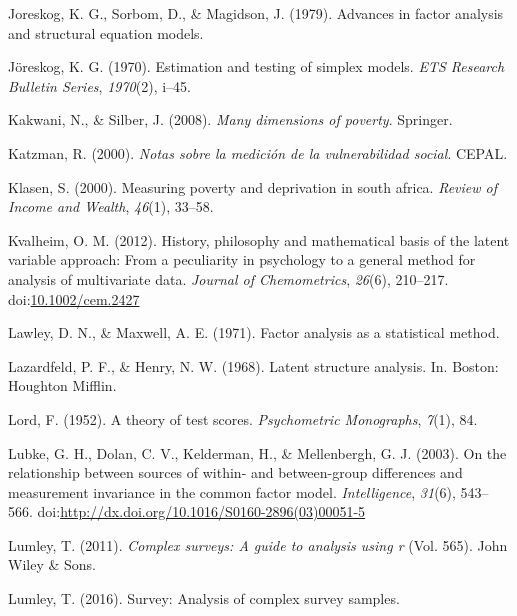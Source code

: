 \documentclass[]{book}
\begin{document}
\leavevmode\hypertarget{ref-Joreskog1979}{}%
Joreskog, K. G., Sorbom, D., \& Magidson, J. (1979). Advances in factor analysis and structural equation models.

\leavevmode\hypertarget{ref-Joereskog1970}{}%
Jöreskog, K. G. (1970). Estimation and testing of simplex models. \emph{ETS Research Bulletin Series}, \emph{1970}(2), i--45.

\leavevmode\hypertarget{ref-Kakwani2008a}{}%
Kakwani, N., \& Silber, J. (2008). \emph{Many dimensions of poverty}. Springer.

\leavevmode\hypertarget{ref-Katzman2000}{}%
Katzman, R. (2000). \emph{Notas sobre la medición de la vulnerabilidad social}. CEPAL.

\leavevmode\hypertarget{ref-Klasen2000}{}%
Klasen, S. (2000). Measuring poverty and deprivation in south africa. \emph{Review of Income and Wealth}, \emph{46}(1), 33--58.

\leavevmode\hypertarget{ref-Kvalheim2012}{}%
Kvalheim, O. M. (2012). History, philosophy and mathematical basis of the latent variable approach: From a peculiarity in psychology to a general method for analysis of multivariate data. \emph{Journal of Chemometrics}, \emph{26}(6), 210--217. doi:\href{https://doi.org/10.1002/cem.2427}{10.1002/cem.2427}

\leavevmode\hypertarget{ref-Lawley1971}{}%
Lawley, D. N., \& Maxwell, A. E. (1971). Factor analysis as a statistical method.

\leavevmode\hypertarget{ref-Lazardfeld1968}{}%
Lazardfeld, P. F., \& Henry, N. W. (1968). Latent structure analysis. In. Boston: Houghton Mifflin.

\leavevmode\hypertarget{ref-Lord1952}{}%
Lord, F. (1952). A theory of test scores. \emph{Psychometric Monographs}, \emph{7}(1), 84.

\leavevmode\hypertarget{ref-Lubke2003}{}%
Lubke, G. H., Dolan, C. V., Kelderman, H., \& Mellenbergh, G. J. (2003). On the relationship between sources of within- and between-group differences and measurement invariance in the common factor model. \emph{Intelligence}, \emph{31}(6), 543--566. doi:\href{https://doi.org/http://dx.doi.org/10.1016/S0160-2896(03)00051-5}{http://dx.doi.org/10.1016/S0160-2896(03)00051-5}

\leavevmode\hypertarget{ref-Lumley2011}{}%
Lumley, T. (2011). \emph{Complex surveys: A guide to analysis using r} (Vol. 565). John Wiley \& Sons.

\leavevmode\hypertarget{ref-Lumley2016}{}%
Lumley, T. (2016). Survey: Analysis of complex survey samples.
\end{document}
